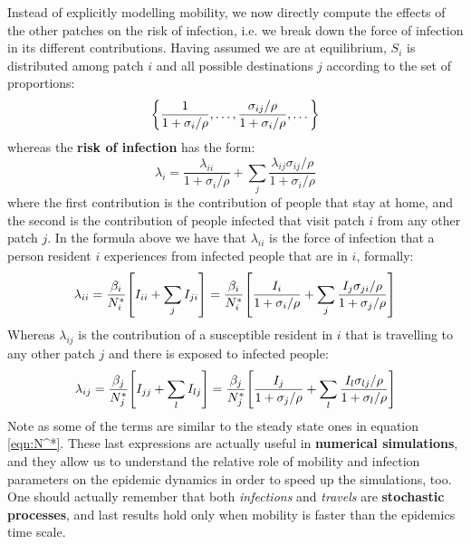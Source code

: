 \documentclass[../main/main.tex]{subfiles}
\begin{document}
Instead of explicitly modelling mobility, we now directly compute the effects of the other patches on the risk of infection, i.e. we break down the force of infection in its different contributions.
Having assumed we are at equilibrium, $S_i$ is distributed among patch $i$ and all possible destinations $j$ according to the set of proportions:
\begin{equation*}
    \qty{ \frac{1}{1+\sigma_i/\rho}, \dots , \frac{\sigma_{ij}/\rho}{1+\sigma_i/\rho}, \dots  }
\end{equation*}
whereas the \textbf{risk of infection} has the form:
\begin{equation}
    \lambda_i = \frac{\lambda_{ii}}{1+\sigma_i/\rho} + \sum_{j} \frac{\lambda_{ij}\sigma_{ij}/\rho}{1+\sigma_i/\rho}
\end{equation}
where the first contribution is the contribution of people that stay at home, and the second is the contribution of people infected that visit patch $i$ from any other patch $j$.
In the formula above we have that $\lambda_{ii}$ is the force of infection that a person resident $i$ experiences from infected people that are in $i$, formally:
\begin{equation}
    \lambda_{ii} = \frac{\beta_i}{N_i^*} \qty[ I_{ii} + \sum_j I_{ji} ] = \frac{\beta_i}{N_i^*} \qty[ \frac{I_i}{1+\sigma_i/\rho} + \sum_j \frac{I_j \sigma_{ji}/\rho}{1+\sigma_j/\rho} ]
\end{equation}
Whereas $\lambda_{ij}$ is the contribution of a susceptible resident in $i$ that is travelling to any other patch $j$ and there is exposed to infected people:
\begin{equation}
    \lambda_{ij} = \frac{\beta_j}{N_j^*} \qty[ I_{jj} + \sum_l I_{lj} ] = \frac{\beta_j}{N_j^*} \qty[ \frac{I_j}{1+\sigma_j/\rho} + \sum_l \frac{I_l \sigma_{lj}/\rho}{1+\sigma_{l}/\rho} ]
    \label{eqn:lambda_ij}
\end{equation}
Note as some of the terms are similar to the steady state ones in equation \ref{eqn:N^*}. These last expressions are actually useful in \textbf{numerical simulations}, and they allow us to understand the relative role of mobility and infection parameters on the epidemic dynamics in order to speed up the simulations, too. One should actually remember that both \textit{infections} and \textit{travels} are \textbf{stochastic processes}, and last results hold only when mobility is faster than the epidemics time scale.
\end{document}
